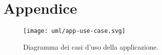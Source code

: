 \section{Appendice}

\begin{figure}[H]
    \centering
    \texttt{[image: uml/app-use-case.svg]}
    \caption{Diagramma dei casi d'uso della applicazione.}
    \label{fig:app-use-case}
\end{figure}

